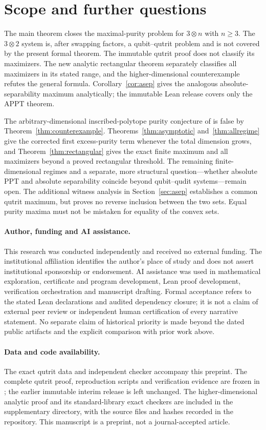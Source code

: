 \documentclass[11pt]{article}
\theoremstyle{remark}\newtheorem{remark}[theorem]{Remark}
\begin{document}
\section{Scope and further questions}
The main theorem closes the maximal-purity problem for $3\otimes n$ with $n\geq3$. The $3\otimes2$ system is, after swapping factors, a qubit--qutrit problem and is not covered by the present formal theorem. The immutable qutrit proof does not classify its maximizers. The new analytic rectangular theorem separately classifies all maximizers in its stated range, and the higher-dimensional counterexample refutes the general formula. Corollary~\ref{cor:asep} gives the analogous absolute-separability maximum analytically; the immutable Lean release covers only the APPT theorem.

The arbitrary-dimensional inscribed-polytope purity conjecture of \cite{AKW} is false by Theorem~\ref{thm:counterexample}. Theorems~\ref{thm:asymptotic} and~\ref{thm:allregime} give the corrected first excess-purity term whenever the total dimension grows, and Theorem~\ref{thm:rectangular} gives the exact finite maximum and all maximizers beyond a proved rectangular threshold. The remaining finite-dimensional regimes and a separate, more structural question---whether absolute PPT and absolute separability coincide beyond qubit--qudit systems---remain open. The additional witness analysis in Section~\ref{sec:asep} establishes a common qutrit maximum, but proves no reverse inclusion between the two sets. Equal purity maxima must not be mistaken for equality of the convex sets.

\paragraph{Author, funding and AI assistance.}
This research was conducted independently and received no external funding. The institutional affiliation identifies the author's place of study and does not assert institutional sponsorship or endorsement. AI assistance was used in mathematical exploration, certificate and program development, Lean proof development, verification orchestration and manuscript drafting. Formal acceptance refers to the stated Lean declarations and audited dependency closure; it is not a claim of external peer review or independent human certification of every narrative statement. No separate claim of historical priority is made beyond the dated public artifacts and the explicit comparison with prior work above.

\paragraph{Data and code availability.}
The exact qutrit data and independent checker accompany this preprint. The complete qutrit proof, reproduction scripts and verification evidence are frozen in \cite{ProofRelease}; the earlier immutable interim release is left unchanged. The higher-dimensional analytic proof and its standard-library exact checkers are included in the supplementary directory, with the source files and hashes recorded in the repository. This manuscript is a preprint, not a journal-accepted article.
\end{document}
